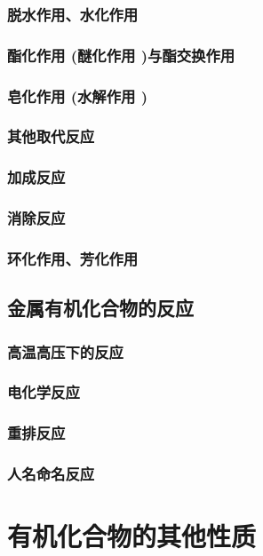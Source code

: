 \documentclass[UTF8]{../03-Chemistry}
\begin{document}
        \subsubsection{脱水作用、水化作用}
        \subsubsection{酯化作用 (醚化作用 )与酯交换作用}
        \subsubsection{皂化作用 (水解作用 )}
        \subsubsection{其他取代反应}
        \subsubsection{加成反应}
        \subsubsection{消除反应}
        \subsubsection{环化作用、芳化作用}
    \subsection{金属有机化合物的反应}
        \subsubsection{高温高压下的反应}
        \subsubsection{电化学反应}
        \subsubsection{重排反应}
        \subsubsection{人名命名反应}

\section{有机化合物的其他性质}
\end{document}
